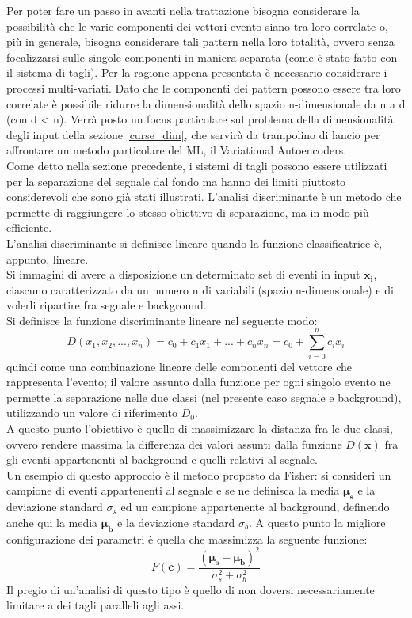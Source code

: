 Per poter fare un passo in avanti nella trattazione bisogna considerare la possibilità che le varie componenti dei vettori evento siano tra loro correlate o, più in generale, bisogna considerare tali pattern nella loro totalità, ovvero senza focalizzarsi sulle singole componenti in maniera separata (come è stato fatto con il sistema di tagli).  Per la ragione appena presentata è necessario considerare i processi multi-variati.	Dato che le componenti dei pattern possono essere tra loro correlate è possibile ridurre la dimensionalità dello spazio n-dimensionale da n a d (con d < n). Verrà posto un focus particolare sul problema della dimensionalità degli input della sezione \ref{curse_dim}, che servirà da trampolino di lancio per affrontare un metodo particolare del ML, il Variational Autoencoders. \\
Come detto nella sezione precedente, i sistemi di tagli possono essere utilizzati per la separazione del segnale dal fondo ma hanno dei limiti piuttosto considerevoli che sono già stati illustrati. L'analisi discriminante è un metodo che permette di raggiungere lo stesso obiettivo di separazione, ma in modo più efficiente. \\
L'analisi discriminante si definisce lineare quando la funzione classificatrice è, appunto, lineare. \\
Si immagini di avere a disposizione un determinato set di eventi in input $\textbf{x}_\textbf{i}$, ciascuno caratterizzato da un numero n di variabili (spazio n-dimensionale) e di volerli ripartire fra segnale e background.\\
Si definisce la funzione discriminante lineare nel seguente modo:
\begin{equation}
D(x_1 , x_2 , ... , x_n) = c_0 + c_1x_1 + ... +c_nx_n = c_0 + \sum_{i=0}^{n} c_ix_i 
\end{equation}
quindi come una combinazione lineare delle componenti del vettore che rappresenta l'evento; il valore assunto dalla funzione per ogni singolo evento ne permette la separazione nelle due classi (nel presente caso segnale e background), utilizzando un valore di riferimento $D_0$. \\
A questo punto l'obiettivo è quello di massimizzare la distanza fra le due classi, ovvero rendere massima la differenza dei valori assunti dalla funzione $D(\textbf{x})$ fra gli eventi appartenenti al background e quelli relativi al segnale. \\
Un esempio di questo approccio è il metodo proposto da Fisher: si consideri un campione di eventi appartenenti al segnale e se ne definisca la media $\bm\mu_\textbf{s}$ e la deviazione standard $\sigma_s$ ed un campione appartenente al background, definendo anche qui la media $\bm\mu_\textbf{b}$ e la deviazione standard $\sigma_b$. A questo punto la migliore configurazione dei parametri è quella che massimizza la seguente funzione: 
\begin{equation}
F(\textbf{c}) = \frac{(\bm\mu_\textbf{s} - \bm\mu_\textbf{b})^2}{\sigma_s^2 + \sigma_b^2}
\end{equation} 
Il pregio di un'analisi di questo tipo è quello di non doversi necessariamente limitare a dei tagli paralleli agli assi. 

